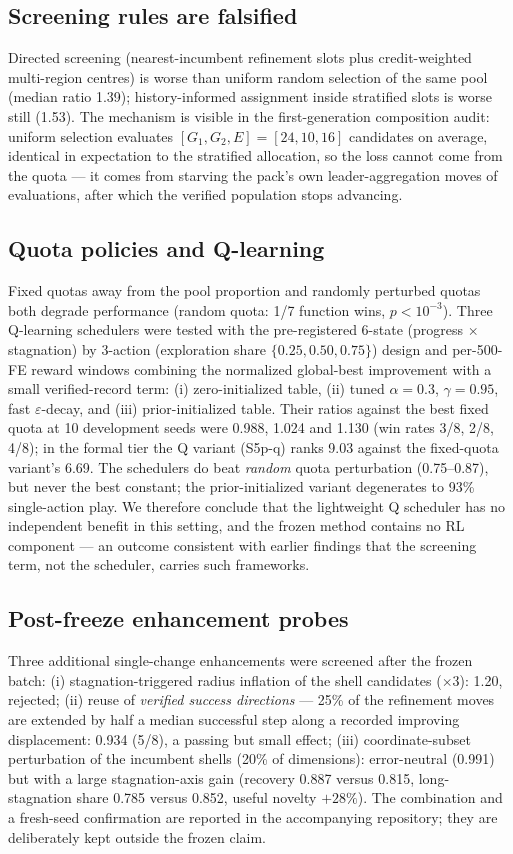 \documentclass[journal]{IEEEtran}
\begin{document}
\subsection{Screening rules are falsified}
Directed screening (nearest-incumbent refinement slots plus
credit-weighted multi-region centres) is worse than uniform random
selection of the same pool (median ratio 1.39); history-informed assignment
inside stratified slots is worse still (1.53). The mechanism is visible in
the first-generation composition audit: uniform selection evaluates
$[G_1,G_2,E]=[24,10,16]$ candidates on average, identical in expectation to
the stratified allocation, so the loss cannot come from the quota --- it
comes from starving the pack's own leader-aggregation moves of evaluations,
after which the verified population stops advancing.

\subsection{Quota policies and Q-learning}
Fixed quotas away from the pool proportion and randomly perturbed quotas
both degrade performance (random quota: 1/7 function wins, $p<10^{-3}$).
Three Q-learning schedulers were tested with the pre-registered 6-state
(progress $\times$ stagnation) by 3-action (exploration share
$\{0.25,0.50,0.75\}$) design and per-500-FE reward windows combining the
normalized global-best improvement with a small verified-record term:
(i) zero-initialized table, (ii) tuned $\alpha=0.3$, $\gamma=0.95$, fast
$\varepsilon$-decay, and (iii) prior-initialized table. Their ratios against
the best fixed quota at 10 development seeds were 0.988, 1.024 and 1.130
(win rates 3/8, 2/8, 4/8); in the formal tier the Q variant (S5p-q) ranks
9.03 against the fixed-quota variant's 6.69. The schedulers do beat
\emph{random} quota perturbation (0.75--0.87), but never the best constant;
the prior-initialized variant degenerates to 93\% single-action play. We
therefore conclude that the lightweight Q scheduler has no independent
benefit in this setting, and the frozen method contains no RL component ---
an outcome consistent with earlier findings that the screening term, not
the scheduler, carries such frameworks.

\subsection{Post-freeze enhancement probes}
Three additional single-change enhancements were screened after the frozen
batch: (i) stagnation-triggered radius inflation of the shell candidates
($\times3$): 1.20, rejected; (ii) reuse of \emph{verified success
directions} --- 25\% of the refinement moves are extended by half a median
successful step along a recorded improving displacement: 0.934 (5/8), a
passing but small effect; (iii) coordinate-subset perturbation of the
incumbent shells (20\% of dimensions): error-neutral (0.991) but with a
large stagnation-axis gain (recovery 0.887 versus 0.815, long-stagnation
share 0.785 versus 0.852, useful novelty $+28\%$). The combination and a
fresh-seed confirmation are reported in the accompanying repository; they
are deliberately kept outside the frozen claim.
\end{document}
